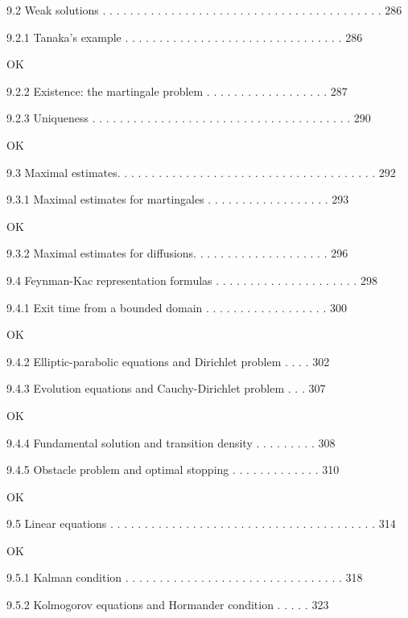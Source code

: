 9.2 Weak solutions . . . . . . . . . . . . . . . . . . . . . . . . . . . . . . . . . . . . . . . . . 286



9.2.1 Tanaka's example . . . . . . . . . . . . . . . . . . . . . . . . . . . . . . . . 286

OK

9.2.2 Existence: the martingale problem . . . . . . . . . . . . . . . . . . 287



9.2.3 Uniqueness . . . . . . . . . . . . . . . . . . . . . . . . . . . . . . . . . . . . . . 290

OK

9.3 Maximal estimates. . . . . . . . . . . . . . . . . . . . . . . . . . . . . . . . . . . . . . 292



9.3.1 Maximal estimates for martingales . . . . . . . . . . . . . . . . . . 293

OK

9.3.2 Maximal estimates for diffusions. . . . . . . . . . . . . . . . . . . . 296



9.4 Feynman-Kac representation formulas . . . . . . . . . . . . . . . . . . . . . 298



9.4.1 Exit time from a bounded domain . . . . . . . . . . . . . . . . . . 300

OK

9.4.2 Elliptic-parabolic equations and Dirichlet problem . . . . 302



9.4.3 Evolution equations and Cauchy-Dirichlet problem . . . 307

OK

9.4.4 Fundamental solution and transition density . . . . . . . . . 308



9.4.5 Obstacle problem and optimal stopping . . . . . . . . . . . . . 310

OK

9.5 Linear equations . . . . . . . . . . . . . . . . . . . . . . . . . . . . . . . . . . . . . . . 314

OK

9.5.1 Kalman condition . . . . . . . . . . . . . . . . . . . . . . . . . . . . . . . . 318



9.5.2 Kolmogorov equations and Hormander condition . . . . . 323

